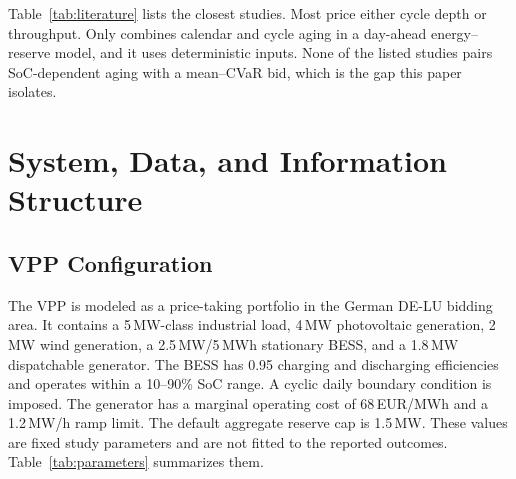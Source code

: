 \documentclass[journal,12pt,twocolumn]{IEEEtran}
\begin{document}
Table~\ref{tab:literature} lists the closest studies. Most price either cycle depth or throughput. Only \cite{Ghanaee2024} combines calendar and cycle aging in a day-ahead energy--reserve model, and it uses deterministic inputs. None of the listed studies pairs SoC-dependent aging with a mean--CVaR bid, which is the gap this paper isolates.

\section{System, Data, and Information Structure}
\label{sec:system}

\subsection{VPP Configuration}
The VPP is modeled as a price-taking portfolio in the German DE-LU bidding area. It contains a 5\,MW-class industrial load, 4\,MW photovoltaic generation, 2\,MW wind generation, a 2.5\,MW/5\,MWh stationary BESS, and a 1.8\,MW dispatchable generator. The BESS has 0.95 charging and discharging efficiencies and operates within a 10--90\% SoC range. A cyclic daily boundary condition is imposed. The generator has a marginal operating cost of 68\,EUR/MWh and a 1.2\,MW/h ramp limit. The default aggregate reserve cap is 1.5\,MW. These values are fixed study parameters and are not fitted to the reported outcomes. Table~\ref{tab:parameters} summarizes them.

\begin{table}[!t]
\caption{VPP, Battery, Market, and Risk Parameters Used in the Numerical Study}
\label{tab:parameters}
\centering
\footnotesize
{}
\end{table}
\end{document}
